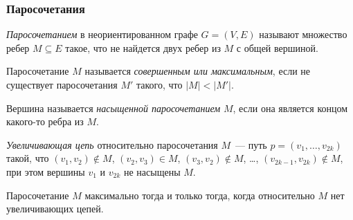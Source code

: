 \subsubsection{Паросочетания}

\emph{Паросочетанием} в неориентированном графе $G = (V, E)$ называют множество ребер $M \subseteq E$ такое, что не найдется двух ребер из $M$ с общей вершиной.

Паросочетание $M$ называется \emph{совершенным или максимальным}, если не существует паросочетания $M'$ такого, что $|M| < |M'|$.

Вершина называется \emph{насыщенной паросочетанием} $M$, если она является концом какого-то ребра из $M$.

\emph{Увеличивающая цепь} относительно паросочетания $M$~--- путь $p = (v_1, \ldots, v_{2k})$ такой, что $(v_1, v_2) \not\in M$, $(v_2, v_3) \in M$, $(v_3, v_2) \not\in M$, \ldots, $(v_{2k-1}, v_{2k}) \not\in M$, при этом вершины $v_1$ и $v_{2k}$ не насыщены $M$.

 Паросочетание $M$ максимально тогда и только тогда, когда относительно $M$ нет увеличивающих цепей.

